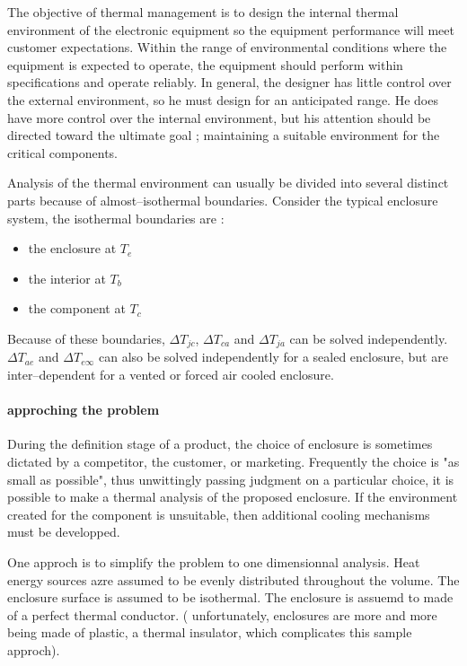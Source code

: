 
The objective of thermal management is to design the internal
thermal environment of the electronic equipment so the equipment
performance will meet customer expectations. Within the range of
environmental conditions where the equipment is expected to operate,
the equipment should perform within specifications and operate
reliably. In general, the designer has little control over the
external environment, so he must design for an anticipated range. He
does have more control over the internal environment, but his
attention should be directed toward the ultimate goal ; maintaining
a suitable environment for the critical components.

Analysis of the thermal environment can usually be divided into
several distinct parts because of almost--isothermal boundaries.
Consider the typical enclosure system, the isothermal boundaries are
:

\begin{itemize}

\item the enclosure at $T_e$
\item the interior at $T_b$
\item the component at $T_c$

\end{itemize}

Because of these boundaries, $\Delta T_{jc}$, $\Delta T_{ca}$ and
$\Delta T_{ja}$ can be solved independently. $\Delta T_{ae}$ and
$\Delta T_{e\infty}$ can also be solved independently for a sealed
enclosure, but are inter--dependent for a vented or forced air
cooled enclosure.

\paragraph{approching the problem}

During the definition stage of a product, the choice of enclosure is
sometimes dictated by a competitor, the customer, or marketing.
Frequently the choice is "as small as possible", thus unwittingly
passing judgment on a particular choice, it is possible to make a
thermal analysis of the proposed enclosure. If the environment
created for the component is unsuitable, then additional cooling
mechanisms must be developped.

One approch is to simplify the problem to one dimensionnal analysis.
Heat energy sources azre assumed to be evenly distributed throughout
the volume. The enclosure surface is assumed to be isothermal. The
enclosure is assuemd to made of a perfect thermal conductor. (
unfortunately, enclosures are more and more being made of plastic, a
thermal insulator, which complicates this sample approch).

